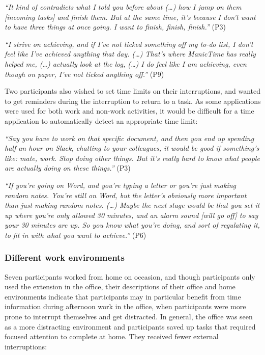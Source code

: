 \textit{“It kind of contradicts what I told you before about (…) how I jump on them [incoming tasks] and finish them. But at the same time, it’s because I don’t want to have three things at once going. I want to finish, finish, finish.”} (P3)

\textit{“I strive on achieving, and if I’ve not ticked something off my to-do list, I don’t feel like I’ve achieved anything that day. (…) That’s where ManicTime has really helped me, (…) actually look at the log, (…) I do feel like I am achieving, even though on paper, I’ve not ticked anything off.”} (P9)

Two participants also wished to set time limits on their interruptions, and wanted to get reminders during the interruption to return to a task. As some applications were used for both work and non-work activities, it would be difficult for a time application to automatically detect an appropriate time limit:

\textit{“Say you have to work on that specific document, and then you end up spending half an hour on Slack, chatting to your colleagues, it would be good if something's like: mate, work. Stop doing other things. But it’s really hard to know what people are actually doing on these things.”} (P3)

\textit{“If you’re going on Word, and you’re typing a letter or you’re just making random notes. You’re still on Word, but the letter’s obviously more important than just making random notes. (…) Maybe the next stage would be that you set it up where you’re only allowed 30 minutes, and an alarm sound [will go off] to say your 30 minutes are up. So you know what you’re doing, and sort of regulating it, to fit in with what you want to achieve.”} (P6)

\subsubsection{Different work environments}
Seven participants worked from home on occasion, and though participants only used the extension in the office, their descriptions of their office and home environments indicate that participants may in particular benefit from time information during afternoon work in the office, when participants were more prone to interrupt themselves and get distracted. In general, the office was seen as a more distracting environment and participants saved up tasks that required focused attention to complete at home. They received fewer external interruptions:

